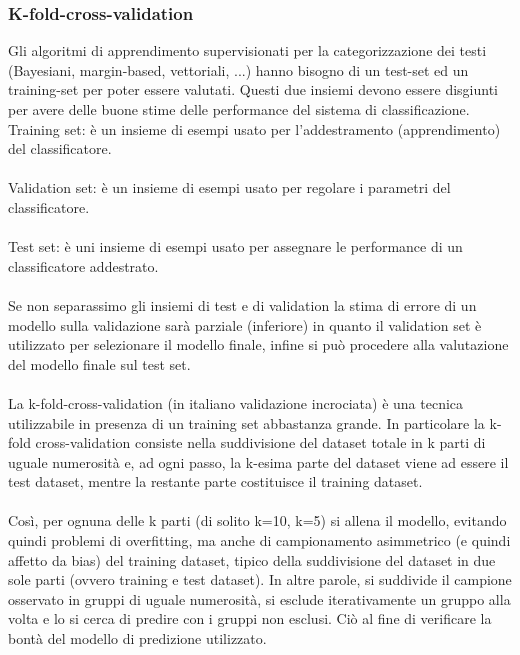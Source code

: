 \documentclass{article}
\theoremstyle{plain}
\theoremstyle{definition}
\begin{document}
\subsubsection{K-fold-cross-validation}
Gli algoritmi di apprendimento supervisionati per la categorizzazione dei testi (Bayesiani, margin-based, vettoriali, ...) hanno bisogno di un test-set ed un training-set per poter essere valutati. Questi due insiemi devono essere disgiunti per avere delle buone stime delle performance del sistema di classificazione.
\\
Training set: è un insieme di esempi usato per l'addestramento (apprendimento) del classificatore.
\\
\\
Validation set: è un insieme di esempi usato per regolare i parametri del classificatore.
\\
\\
Test set: è uni insieme di esempi usato per assegnare le performance di un classificatore addestrato.
\\
\\
Se non separassimo gli insiemi di test e di validation la stima di errore di un modello sulla validazione sarà parziale (inferiore) in quanto il validation set è utilizzato per selezionare il modello finale, infine si può procedere alla valutazione del modello finale sul test set.
\\
\\
La k-fold-cross-validation (in italiano validazione incrociata) è una tecnica utilizzabile in presenza di un training set abbastanza grande. In particolare la k-fold cross-validation consiste nella suddivisione del dataset totale in k parti di uguale numerosità e, ad ogni passo, la k-esima parte del dataset viene ad essere il test dataset, mentre la restante parte costituisce il training dataset.
\\
\\
Così, per ognuna delle k parti (di solito k=10, k=5) si allena il modello, evitando quindi problemi di overfitting, ma anche di campionamento asimmetrico (e quindi affetto da bias) del training dataset, tipico della suddivisione del dataset in due sole parti (ovvero training e test dataset). In altre parole, si suddivide il campione osservato in gruppi di uguale numerosità, si esclude iterativamente un gruppo alla volta e lo si cerca di predire con i gruppi non esclusi. Ciò al fine di verificare la bontà del modello di predizione utilizzato.
\end{document}
